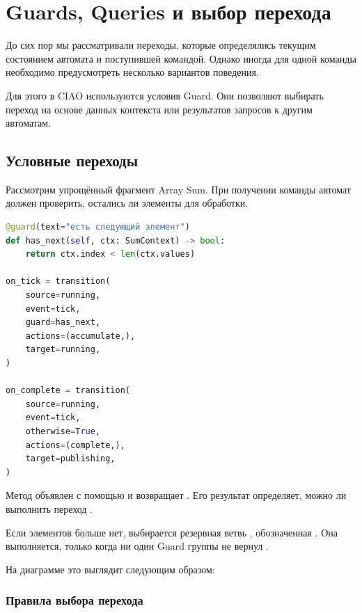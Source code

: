 
\chapter{Guards, Queries и выбор перехода}
\label{chap:guards-queries}

До сих пор мы рассматривали переходы, которые
определялись текущим состоянием автомата и поступившей
командой. Однако иногда для одной команды необходимо
предусмотреть несколько вариантов поведения.

Для этого в CIAO используются условия Guard.
Они позволяют выбирать переход на основе данных
контекста или результатов запросов к другим автоматам.

\section{Условные переходы}

Рассмотрим упрощённый фрагмент Array Sum.
При получении команды  автомат должен
проверить, остались ли элементы для обработки.

\begin{lstlisting}[language=Python,numbers=none]
@guard(text="есть следующий элемент")
def has_next(self, ctx: SumContext) -> bool:
    return ctx.index < len(ctx.values)

on_tick = transition(
    source=running,
    event=tick,
    guard=has_next,
    actions=(accumulate,),
    target=running,
)

on_complete = transition(
    source=running,
    event=tick,
    otherwise=True,
    actions=(complete,),
    target=publishing,
)
\end{lstlisting}

Метод  объявлен с помощью
 и возвращает .
Его результат определяет, можно ли выполнить
переход .

Если элементов больше нет, выбирается резервная
ветвь , обозначенная
. Она выполняется, только
когда ни один Guard группы не вернул .

На диаграмме это выглядит следующим образом:

\noindent\begin{minipage}{\textwidth}
  \centering
  
  \label{fig:guard-transition}
\end{minipage}

\subsection{Правила выбора перехода}

